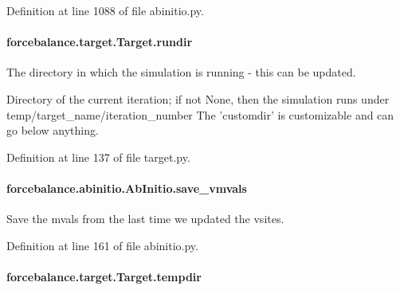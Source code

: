 Definition at line 1088 of file abinitio.\-py.

\hypertarget{classforcebalance_1_1target_1_1Target_a6872de5b2d4273b82336ea5b0da29c9e}{
\paragraph[{rundir}]{\setlength{\rightskip}{0pt plus 5cm}forcebalance.\-target.\-Target.\-rundir\hspace{0.3cm}{\ttfamily [inherited]}}}\label{classforcebalance_1_1target_1_1Target_a6872de5b2d4273b82336ea5b0da29c9e}


The directory in which the simulation is running -\/ this can be updated. 

Directory of the current iteration; if not None, then the simulation runs under temp/target\-\_\-name/iteration\-\_\-number The 'customdir' is customizable and can go below anything.

Definition at line 137 of file target.\-py.

\hypertarget{classforcebalance_1_1abinitio_1_1AbInitio_a22037bf43728fa45f387390005e0b131}{
\paragraph[{save\-\_\-vmvals}]{\setlength{\rightskip}{0pt plus 5cm}forcebalance.\-abinitio.\-Ab\-Initio.\-save\-\_\-vmvals\hspace{0.3cm}{\ttfamily [inherited]}}}\label{classforcebalance_1_1abinitio_1_1AbInitio_a22037bf43728fa45f387390005e0b131}


Save the mvals from the last time we updated the vsites. 



Definition at line 161 of file abinitio.\-py.

\hypertarget{classforcebalance_1_1target_1_1Target_aa1f01b5b78db253b5b66384ed11ed193}{
\paragraph[{tempdir}]{\setlength{\rightskip}{0pt plus 5cm}forcebalance.\-target.\-Target.\-tempdir\hspace{0.3cm}{\ttfamily [inherited]}}}\label{classforcebalance_1_1target_1_1Target_aa1f01b5b78db253b5b66384ed11ed193}


